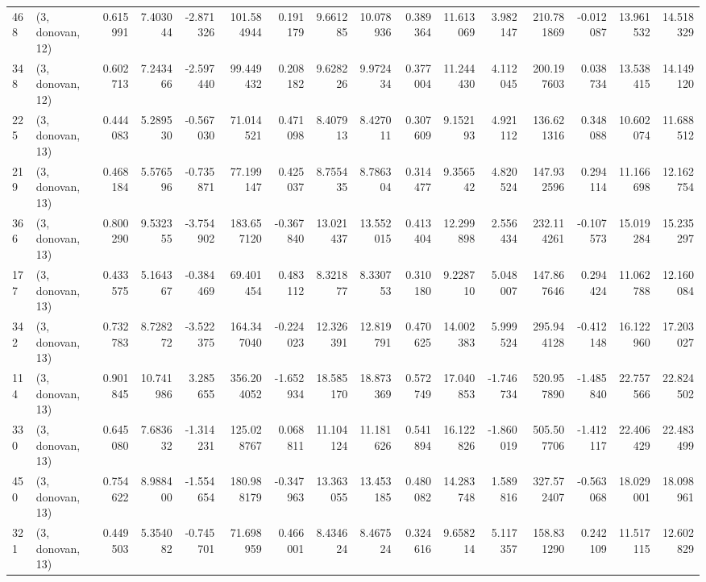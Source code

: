 \begin{tabular}{llrrrrrrrrrrrrrr}
468 &  (3, donovan, 12) &   0.615991 &   7.403044 &  -2.871326 &   101.584944 &   0.191179 &   9.661285 &  10.078936 &  0.389364 &  11.613069 &   3.982147 &   210.781869 &  -0.012087 &  13.961532 &  14.518329 \\
348 &  (3, donovan, 12) &   0.602713 &   7.243466 &  -2.597440 &    99.449432 &   0.208182 &   9.628226 &   9.972434 &  0.377004 &  11.244430 &   4.112045 &   200.197603 &   0.038734 &  13.538415 &  14.149120 \\
225 &  (3, donovan, 13) &   0.444083 &   5.289530 &  -0.567030 &    71.014521 &   0.471098 &   8.407913 &   8.427011 &  0.307609 &   9.152193 &   4.921112 &   136.621316 &   0.348088 &  10.602074 &  11.688512 \\
219 &  (3, donovan, 13) &   0.468184 &   5.576596 &  -0.735871 &    77.199147 &   0.425037 &   8.755435 &   8.786304 &  0.314477 &   9.356542 &   4.820524 &   147.932596 &   0.294114 &  11.166698 &  12.162754 \\
366 &  (3, donovan, 13) &   0.800290 &   9.532355 &  -3.754902 &   183.657120 &  -0.367840 &  13.021437 &  13.552015 &  0.413404 &  12.299898 &   2.556434 &   232.114261 &  -0.107573 &  15.019284 &  15.235297 \\
177 &  (3, donovan, 13) &   0.433575 &   5.164367 &  -0.384469 &    69.401454 &   0.483112 &   8.321877 &   8.330753 &  0.310180 &   9.228710 &   5.048007 &   147.867646 &   0.294424 &  11.062788 &  12.160084 \\
342 &  (3, donovan, 13) &   0.732783 &   8.728272 &  -3.522375 &   164.347040 &  -0.224023 &  12.326391 &  12.819791 &  0.470625 &  14.002383 &   5.999524 &   295.944128 &  -0.412148 &  16.122960 &  17.203027 \\
114 &  (3, donovan, 13) &   0.901845 &  10.741986 &   3.285655 &   356.204052 &  -1.652934 &  18.585170 &  18.873369 &  0.572749 &  17.040853 &  -1.746734 &   520.957890 &  -1.485840 &  22.757566 &  22.824502 \\
330 &  (3, donovan, 13) &   0.645080 &   7.683632 &  -1.314231 &   125.028767 &   0.068811 &  11.104124 &  11.181626 &  0.541894 &  16.122826 &  -1.860019 &   505.507706 &  -1.412117 &  22.406429 &  22.483499 \\
450 &  (3, donovan, 13) &   0.754622 &   8.988400 &  -1.554654 &   180.988179 &  -0.347963 &  13.363055 &  13.453185 &  0.480082 &  14.283748 &   1.589816 &   327.572407 &  -0.563068 &  18.029001 &  18.098961 \\
321 &  (3, donovan, 13) &   0.449503 &   5.354082 &  -0.745701 &    71.698959 &   0.466001 &   8.434624 &   8.467524 &  0.324616 &   9.658214 &   5.117357 &   158.831290 &   0.242109 &  11.517115 &  12.602829 \\

\end{tabular}
